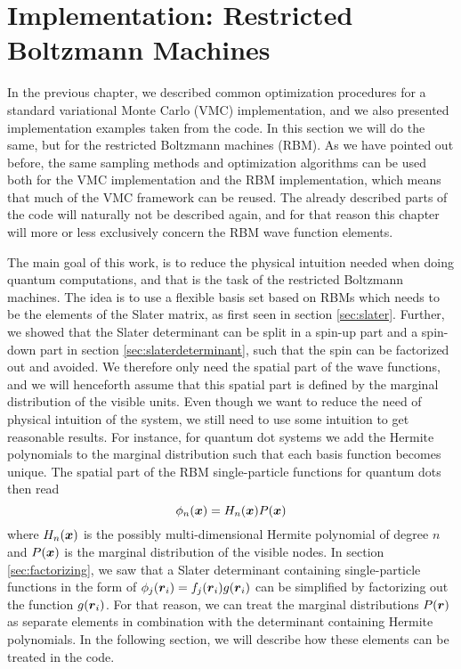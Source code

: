 \chapter{Implementation: Restricted Boltzmann Machines} \label{chp:rbmimplementation}
In the previous chapter, we described common optimization procedures for a standard variational Monte Carlo (VMC) implementation, and we also presented implementation examples taken from the code. In this section we will do the same, but for the restricted Boltzmann machines (RBM). As we have pointed out before, the same sampling methods and optimization algorithms can be used both for the VMC implementation and the RBM implementation, which means that much of the VMC framework can be reused. The already described parts of the code will naturally not be described again, and for that reason this chapter will more or less exclusively concern the RBM wave function elements.

The main goal of this work, is to reduce the physical intuition needed when doing quantum computations, and that is the task of the restricted Boltzmann machines. The idea is to use a flexible basis set based on RBMs which needs to be the elements of the Slater matrix, as first seen in section \ref{sec:slater}. Further, we showed that the Slater determinant can be split in a spin-up part and a spin-down part in section \ref{sec:slaterdeterminant}, such that the spin can be factorized out and avoided. We therefore only need the spatial part of the wave functions, and we will henceforth assume that this spatial part is defined by the marginal distribution of the visible units. Even though we want to reduce the need of physical intuition of the system, we still need to use some intuition to get reasonable results. For instance, for quantum dot systems we add the Hermite polynomials to the marginal distribution such that each basis function becomes unique. The spatial part of the RBM single-particle functions for quantum dots then read
\begin{equation}
\phi_n(\boldsymbol{{x}})=H_n(\boldsymbol{{x}})P(\boldsymbol{{x}})
\end{equation}
where $H_n(\boldsymbol{{x}})$ is the possibly multi-dimensional Hermite polynomial of degree $n$ and $P(\boldsymbol{{x}})$ is the marginal distribution of the visible nodes. In section \ref{sec:factorizing}, we saw that a Slater determinant containing single-particle functions in the form of $\phi_j(\boldsymbol{{r}}_i)=f_j(\boldsymbol{{r}}_i)g(\boldsymbol{{r}}_i)$ can be simplified by factorizing out the function $g(\boldsymbol{{r}}_i)$. For that reason, we can treat the marginal distributions $P(\boldsymbol{{r}})$ as separate elements in combination with the determinant containing Hermite polynomials. In the following section, we will describe how these elements can be treated in the code. 

